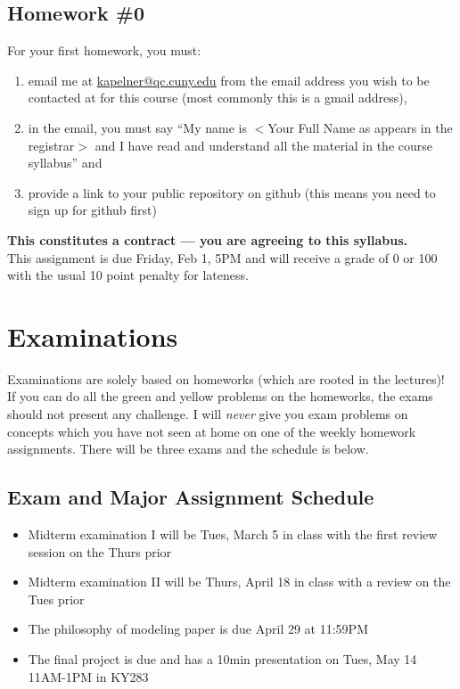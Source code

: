 \documentclass[12pt]{article}
\newcommand{\inred}[1]{\color{red}\textbf{#1} \color{black}}
\newcommand{\qu}[1]{``#1''}
\begin{document}
\subsection*{Homework \#0}

For your first homework, you must:

\begin{enumerate}[(1)]
\item email me at \href{kapelner@qc.cuny.edu}{kapelner@qc.cuny.edu} from the email address you wish to be contacted at for this course (most commonly this is a gmail address),
\item in the email, you must say \qu{My name is $<$Your Full Name as appears in the registrar$>$ and I have read and understand all the material in the course syllabus} and
\item provide a link to your public repository on github (this means you need to sign up for github first)
\end{enumerate}

\noindent \inred{This constitutes a contract --- you are agreeing to this syllabus.} \\

This assignment is due Friday, Feb 1, 5PM and will receive a grade of 0 or 100 with the usual 10 point penalty for lateness.

\section*{Examinations}

Examinations are solely based on homeworks (which are rooted in the lectures)! If you can do all the green and yellow problems on the homeworks, the exams should not present any challenge. I will \textit{never} give you exam problems on concepts which you have not seen at home on one of the weekly homework assignments. There will be three exams and the schedule is below.

\subsection*{Exam and Major Assignment Schedule}\label{subsec:exam_schedule}

\begin{itemize}
\itemsep -0.0em 
\item Midterm examination I will be Tues, March 5 in class with the first review session on the Thurs prior
\item Midterm examination II will be Thurs, April 18 in class with a review on the Tues prior
\item The philosophy of modeling paper is due April 29 at 11:59PM
\item The final project is due and has a 10min presentation on Tues, May 14 11AM-1PM in KY283
\end{itemize}
\end{document}
